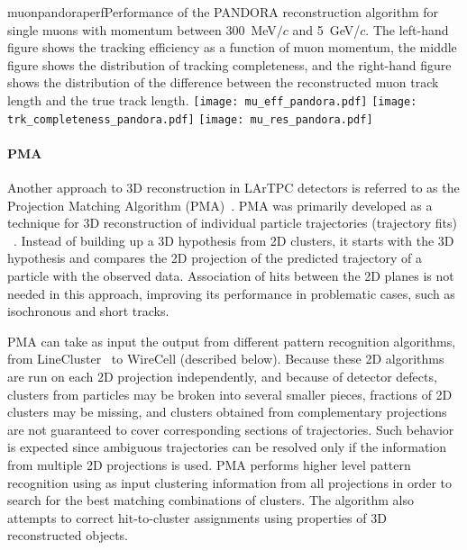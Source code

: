 \begin{cdrfigure}{muonpandoraperf}{Performance of the PANDORA reconstruction algorithm for single muons with 
momentum between 300~MeV$/c$ and 5~GeV/$c$.  The left-hand figure shows the tracking efficiency as a function of
muon momentum, the middle figure shows the distribution of tracking completeness, and the right-hand figure shows the
distribution of the difference between the reconstructed muon track length and the true track length.}
\texttt{[image: mu\_eff\_pandora.pdf]}
\texttt{[image: trk\_completeness\_pandora.pdf]}
\texttt{[image: mu\_res\_pandora.pdf]}
\end{cdrfigure}


\paragraph{PMA}
Another approach to 3D reconstruction in LArTPC detectors is referred to as the Projection Matching Algorithm
(PMA)~\cite{pma_algorithm}. PMA was primarily developed as a technique for 3D reconstruction
of individual particle trajectories (trajectory fits) ~\cite{icarus3dreco}. Instead of
building up a 3D hypothesis from 2D clusters, it starts with the 3D hypothesis and compares
the 2D projection of the predicted trajectory of a particle with the observed data. Association
of hits between the 2D planes is not needed in this approach, improving its performance in
problematic cases, such as isochronous and short tracks.

PMA can take as input the output from different pattern recognition algorithms, from
LineCluster~\cite{linecluster} to WireCell (described below).  Because these 2D algorithms
are run on each 2D projection independently, and because of detector defects,
clusters from  particles may be broken
into several smaller pieces, fractions of 2D clusters may be missing,
and clusters obtained from complementary projections are not guaranteed to cover corresponding
sections of trajectories. Such behavior is expected since ambiguous 
trajectories can be resolved only if the information from multiple 2D projections is used.
PMA performs higher level pattern recognition using as input clustering information from all
projections in order to search for the best matching combinations of clusters. The algorithm
also attempts to correct hit-to-cluster assignments using properties of 3D reconstructed objects.

